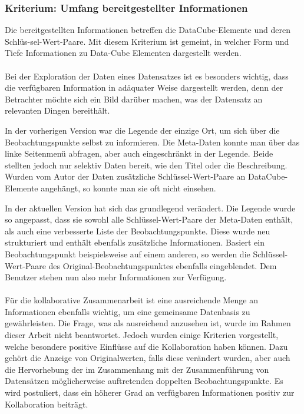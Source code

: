 \documentclass[11pt]{article}
\newcommand{\com}[1]{\marginpar{\em {\small{#1}}}} %
\begin{document}
%
%
%
\subsubsection{Kriterium: Umfang bereitgestellter Informationen}

Die bereitgestellten Informationen betreffen die DataCube-Elemente und deren Schlüs-sel-Wert-Paare. Mit diesem Kriterium ist gemeint, in welcher Form und Tiefe Informationen zu Data-Cube Elementen dargestellt werden.  

\paragraph{} Bei der Exploration der Daten eines Datensatzes ist es besonders wichtig, dass die verfügbaren Information in adäquater Weise dargestellt werden, denn der Betrachter möchte sich ein Bild darüber machen, was der Datensatz an relevanten Dingen bereithält.

In der vorherigen Version\com{Vorherige Version} war die Legende der einzige Ort, um sich über die Beobachtungspunkte selbst zu informieren. Die Meta-Daten konnte man über das linke Seitenmenü abfragen, aber auch eingeschränkt in der Legende. Beide stellten jedoch nur selektiv Daten bereit, wie den Titel oder die Beschreibung. Wurden vom Autor der Daten zusätzliche Schlüssel-Wert-Paare an DataCube-Elemente angehängt, so konnte man sie oft nicht einsehen.

In der aktuellen Version\com{Aktuelle \\ Version} hat sich das grundlegend verändert. Die Legende wurde so angepasst, dass sie sowohl alle Schlüssel-Wert-Paare der Meta-Daten enthält, als auch eine verbesserte Liste der Beobachtungspunkte. Diese wurde neu strukturiert und enthält ebenfalls zusätzliche Informationen. Basiert ein Beobachtungspunkt beispielsweise auf einem anderen, so werden die Schlüssel-Wert-Paare des Original-Beobachtungspunktes ebenfalls eingeblendet. Dem Benutzer stehen nun also mehr Informationen zur Verfügung.


\paragraph{} Für die kollaborative Zusammenarbeit ist eine ausreichende Menge an Informationen ebenfalls wichtig, um eine gemeinsame Datenbasis zu gewährleisten. Die Frage, was als ausreichend anzusehen ist, wurde im Rahmen dieser Arbeit nicht beantwortet. Jedoch wurden einige Kriterien vorgestellt, welche besondere positive Einflüsse auf die Kollaboration haben können. Dazu gehört die Anzeige von Originalwerten, falls diese verändert wurden, aber auch die Hervorhebung der im Zusammenhang mit der Zusammenführung von Datensätzen möglicherweise auftretenden doppelten Beobachtungspunkte. Es wird postuliert, dass ein höherer Grad an verfügbaren Informationen positiv zur Kollaboration beiträgt.  
\end{document}

